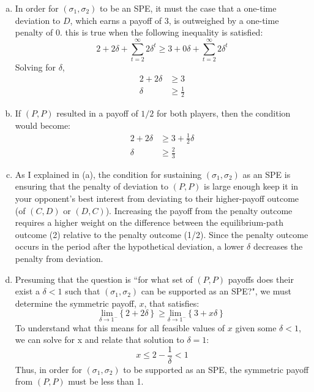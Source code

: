 \documentclass{article}
\begin{document}
\begin{enumerate}[(a)]
	\item In order for ${(\sigma_1,\sigma_2)}$ to be an SPE, it must the case that a one-time deviation to $D$, which earns a payoff of 3, is outweighed by a one-time penalty of 0. this is true when the following inequality is satisfied:
		\[
			2 + 2\delta + \sum_{t=2}^\infty 2\delta^t \geq 3 + 0\delta + \sum_{t=2}^\infty 2\delta^t
		\]
		Solving for $\delta$,
		\begin{align*}
			2 + 2\delta &\geq 3	\\
			\delta &\geq \frac{1}{2}
		\end{align*}	
	
	\item If $(P,P)$ resulted in a payoff of $1/2$ for both players, then the condition would become:
		\begin{align*}
			2 + 2\delta &\geq 3	 + \frac{1}{2}\delta\\
			\delta &\geq \frac{2}{3}
		\end{align*}	
	
	\item As I explained in (a), the condition for sustaining ${(\sigma_1,\sigma_2)}$ as an SPE is ensuring that the penalty of deviation to $(P,P)$ is large enough keep it in your opponent's best interest from deviating to their higher-payoff outcome (of $(C,D)$ or $(D,C)$). Increasing the payoff from the penalty outcome requires a higher weight on the difference between the equilibrium-path outcome (2) relative to the penalty outcome (1/2). Since the penalty outcome occurs in the period after the hypothetical deviation, a lower $\delta$ decreases the penalty from deviation.
	
	\item Presuming that the question is ``for what set of $(P,P)$ payoffs does their exist a ${\delta<1}$ such that ${(\sigma_1,\sigma_2)}$ can be supported as an SPE?", we must determine the symmetric payoff, $x$, that satisfies:
		\[
			\underset{\delta\rightarrow 1^-}{\text{lim }}\left\{2 + 2\delta\right\} \geq \underset{\delta\rightarrow 1^-}{\text{lim }}\left\{3	 + x\delta\right\} 
		\]
		To understand what this means for all feasible values of $x$ given some ${\delta<1}$, we can solve for x and relate that solution to ${\delta=1}$:
		\[
			x \leq 2 - \frac{1}{\delta} < 1
		\]
		Thus, in order for ${(\sigma_1,\sigma_2)}$ to be supported as an SPE, the symmetric payoff from $(P,P)$ must be less than 1.
	
\end{enumerate}
\end{document}
